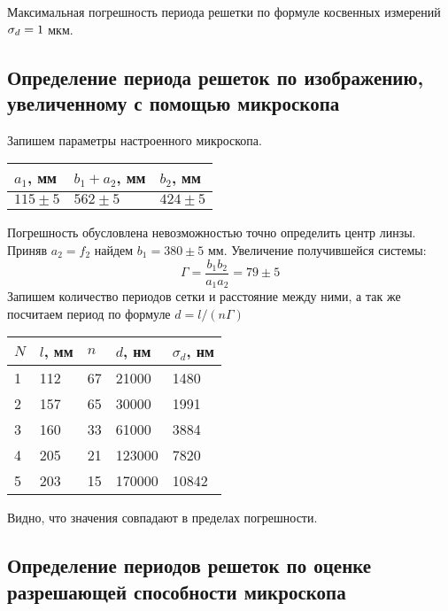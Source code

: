 	Максимальная погрешность периода решетки по формуле косвенных измерений $\sigma_d \hm= 1$ мкм.
	
	\subsection{Определение периода решеток по изображению, увеличенному с помощью микроскопа}
	
	Запишем параметры настроенного микроскопа.
	\begin{table}[H]
		\centering
		\begin{tabular}{|l|l|l|}
			\hline
			$a_1$, мм  & $b_1+a_2$, мм & $b_2$, мм  \\ \hline
			$115\pm 5$ & $562\pm 5$    & $424\pm 5$ \\ \hline
		\end{tabular}
	\end{table}
	Погрешность обусловлена невозможностью точно определить центр линзы. Приняв $a_2 = f_2$ найдем $b_1 = 380 \pm5$ мм. Увеличение получившейся системы:
	\[
		\Gamma = \frac{b_1b_2}{a_1a_2} = 79 \pm 5
	\]
	Запишем количество периодов сетки и расстояние между ними, а так же посчитаем период по формуле $d = l/(n\Gamma)$
	\begin{table}[H]
		\centering
		\begin{tabular}{|l|l|l|l|l|}
			\hline
			$N$ & $l$, мм & $n$ & $d$, нм & $\sigma_d$, нм \\ \hline
			1   & 112     & 67  & 21000   & 1480       \\ \hline
			2   & 157     & 65  & 30000   & 1991       \\ \hline
			3   & 160     & 33  & 61000   & 3884       \\ \hline
			4   & 205     & 21  & 123000  & 7820       \\ \hline
			5   & 203     & 15  & 170000  & 10842      \\ \hline
		\end{tabular}
	\end{table}
	Видно, что значения совпадают в пределах погрешности.
	
	\subsection{Определение периодов решеток по оценке разрешающей способности микроскопа}
	
